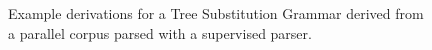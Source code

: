 \begin{figure}[t]
  \centering
\caption{Example derivations for a Tree Substitution Grammar derived from a parallel corpus parsed with a supervised parser.}
\label{fig:intro_tsg}
\end{figure}

